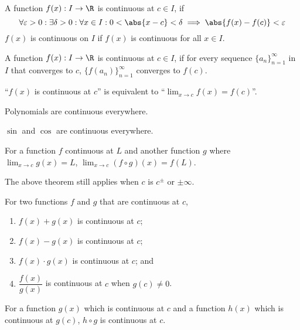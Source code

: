 \documentclass{article}
\begin{document}
%
\begin{definition}
    A function $f(x):I\to\R$ is continuous at $c \in I$, if
    \begin{equation*}
        \forall\varepsilon>0: \exists\delta>0: \forall x\in I:0<\abs{x-c}<\delta \implies \abs{f(x)-f(c)}<\varepsilon
    \end{equation*}
    $f(x)$ is continuous on $I$ if $f(x)$ is continuous for all $x \in I$.
\end{definition}
%
\begin{definition}
    A function $f(x):I\to\R$ is continuous at $c \in I$, if
    for every sequence $\{a_n\}^{\infty}_{n=1}$ in $I$ that converges to $c$,
    $\{f(a_n)\}^{\infty}_{n=1}$ converges to $f(c)$.
\end{definition}
%
\begin{note}
    ``$f(x)$ is continuous at $c$'' is equivalent to
    ``$\displaystyle \lim_{x\to c} f(x) = f(c)$''.
\end{note}
%
\begin{note}
    Polynomials are continuous everywhere.
\end{note}
%
\begin{note}
    $\sin$ and $\cos$ are continuous everywhere.
\end{note}
%
\begin{theorem}
    For a function $f$ continuous at $L$
    and another function $g$ where $\displaystyle \lim_{x\to c}g(x) = L$,
    $\displaystyle \lim_{x\to c} (f \circ g)(x) = f(L)$.
\end{theorem}
\begin{note}
    The above theorem still applies when $c$ is $c^\pm$ or $\pm\infty$.
\end{note}
%
\begin{theorem}
    For two functions $f$ and $g$ that are continuous at $c$,
    \begin{enumerate}[label=\normalfont\alph*)]
        \item $f(x) + g(x)$ is continuous at $c$;
        \item $f(x) - g(x)$ is continuous at $c$;
        \item $f(x) \cdot g(x)$ is continuous at $c$; and
        \item $\dfrac{f(x)}{g(x)}$ is continuous at $c$ when $g(c)\ne0$.
    \end{enumerate}
\end{theorem}
%
\begin{theorem}
    For a function $g(x)$ which is continuous at $c$ and
    a function $h(x)$ which is continuous at $g(c)$,
    $h \circ g$ is continuous at $c$.
\end{theorem}
\end{document}
